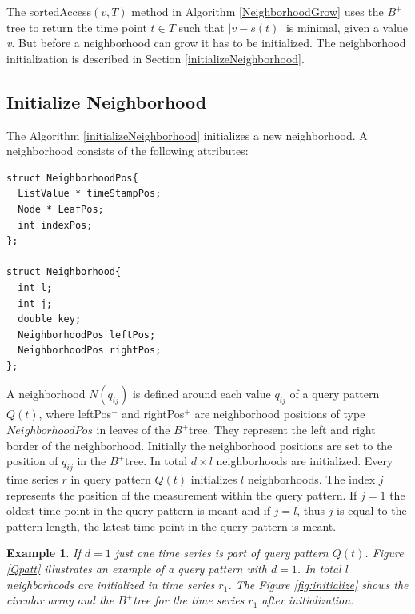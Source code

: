 \documentclass[abstracton,12pt,oneside]{scrreprt}
\newtheorem{example}{Example}
\begin{document}
The sortedAccess$(v,T)$ method in Algorithm \ref{NeighborhoodGrow} uses the $B^+$tree to return the time point $t \in T$ such that $|v-s(t)|$ is minimal, given a value \emph{v}. But before a neighborhood can grow it has to be initialized. The neighborhood initialization is described in Section \ref{initializeNeighborhood}.

\subsection{Initialize Neighborhood}
The Algorithm \ref{initializeNeighborhood} initializes a new neighborhood. A neighborhood consists of the following attributes: 
\lstset{language=C}
\begin{lstlisting}
struct NeighborhoodPos{
  ListValue * timeStampPos;
  Node * LeafPos;
  int indexPos;
};

struct Neighborhood{
  int l;
  int j;
  double key;
  NeighborhoodPos leftPos;
  NeighborhoodPos rightPos;
};
\end{lstlisting}
\BlankLine
A neighborhood $N(q_{ij})$ is defined around each value $q_{ij}$ of a query pattern $Q(t)$, where leftPos$^-$ and rightPos$^+$ are neighborhood positions of type $NeighborhoodPos$ in leaves of the $B^+$tree. They represent the left and right border of the neighborhood. Initially the neighborhood positions are set to the position of $q_{ij}$ in the $B^+$tree. In total $d \times l$ neighborhoods are initialized. Every time series $r$ in query pattern $Q(t)$ initializes $l$ neighborhoods. The index $j$ represents the position of the measurement within the query pattern. If $j=1$ the oldest time point in the query pattern is meant and if $j=l$, thus $j$ is equal to the pattern length, the latest time point in the query pattern is meant. 



\begin{example}
	If $d=1$ just one time series is part of query pattern $Q(t)$. Figure \ref{Qpatt} illustrates an example of a query pattern with $d=1$. In total $l$ neighborhoods are initialized in time series $r_1$. The Figure \ref{fig:initialize} shows the circular array and the $B^+$tree for the time series $r_1$ after initialization.
\end{example}
\end{document}
